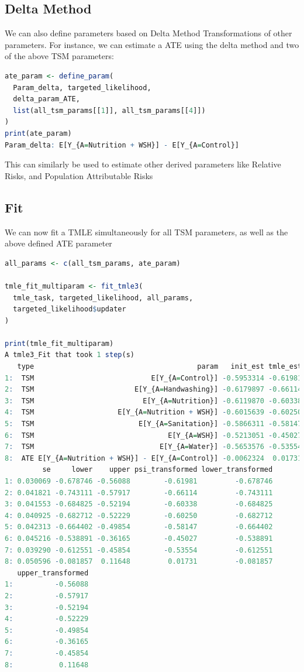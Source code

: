 \documentclass[12pt, krantz2,]{krantz}
\theoremstyle{definition}
\theoremstyle{definition}
\theoremstyle{definition}
\newcommand{\1}{\mathbbm{1}}
\begin{document}
\hypertarget{delta-method}{%
\subsection{Delta Method}\label{delta-method}}

We can also define parameters based on Delta Method Transformations of other
parameters. For instance, we can estimate a ATE using the delta method and two
of the above TSM parameters:

\begin{lstlisting}[language=R]
ate_param <- define_param(
  Param_delta, targeted_likelihood,
  delta_param_ATE,
  list(all_tsm_params[[1]], all_tsm_params[[4]])
)
print(ate_param)
Param_delta: E[Y_{A=Nutrition + WSH}] - E[Y_{A=Control}]
\end{lstlisting}

This can similarly be used to estimate other derived parameters like Relative
Risks, and Population Attributable Risks

\hypertarget{fit}{%
\subsection{Fit}\label{fit}}

We can now fit a TMLE simultaneously for all TSM parameters, as well as the
above defined ATE parameter

\begin{lstlisting}[language=R]
all_params <- c(all_tsm_params, ate_param)

tmle_fit_multiparam <- fit_tmle3(
  tmle_task, targeted_likelihood, all_params,
  targeted_likelihood$updater
)

print(tmle_fit_multiparam)
A tmle3_Fit that took 1 step(s)
   type                                       param   init_est tmle_est
1:  TSM                            E[Y_{A=Control}] -0.5953314 -0.61981
2:  TSM                        E[Y_{A=Handwashing}] -0.6179897 -0.66114
3:  TSM                          E[Y_{A=Nutrition}] -0.6119870 -0.60338
4:  TSM                    E[Y_{A=Nutrition + WSH}] -0.6015639 -0.60250
5:  TSM                         E[Y_{A=Sanitation}] -0.5866311 -0.58147
6:  TSM                                E[Y_{A=WSH}] -0.5213051 -0.45027
7:  TSM                              E[Y_{A=Water}] -0.5653576 -0.53554
8:  ATE E[Y_{A=Nutrition + WSH}] - E[Y_{A=Control}] -0.0062324  0.01731
         se     lower    upper psi_transformed lower_transformed
1: 0.030069 -0.678746 -0.56088        -0.61981         -0.678746
2: 0.041821 -0.743111 -0.57917        -0.66114         -0.743111
3: 0.041553 -0.684825 -0.52194        -0.60338         -0.684825
4: 0.040925 -0.682712 -0.52229        -0.60250         -0.682712
5: 0.042313 -0.664402 -0.49854        -0.58147         -0.664402
6: 0.045216 -0.538891 -0.36165        -0.45027         -0.538891
7: 0.039290 -0.612551 -0.45854        -0.53554         -0.612551
8: 0.050596 -0.081857  0.11648         0.01731         -0.081857
   upper_transformed
1:          -0.56088
2:          -0.57917
3:          -0.52194
4:          -0.52229
5:          -0.49854
6:          -0.36165
7:          -0.45854
8:           0.11648
\end{lstlisting}
\end{document}
